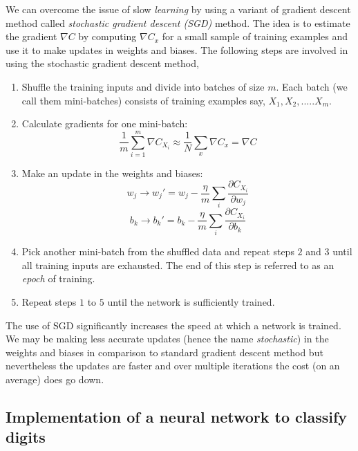 We can overcome the issue of slow \emph{learning} by using a variant of gradient descent method called \emph{stochastic gradient descent (SGD)} method. The idea is to estimate the gradient
$\nabla C$ by computing $\nabla C_x$ for a small sample of training examples and use it to make updates in weights and biases. The following steps are involved in using the stochastic gradient descent method,
\begin{enumerate}
    \item Shuffle the training inputs and divide into batches of size $m$. Each batch (we call them mini-batches) consists of training examples say, $X_1, X_2, .....X_m$.
    \item Calculate gradients for one mini-batch: $$\frac{1}{m} \sum_{i=1}^{m} \nabla C_{X_i} \approx \frac{1}{N} \sum_x \nabla C_x = \nabla C$$
    \item Make an update in the weights and biases: 
    $$w_j \rightarrow w_j' = w_j - \frac{\eta}{m} \sum_i \frac{\partial C_{X_i}}{\partial w_j}$$
    $$b_k \rightarrow b_k' = b_k - \frac{\eta}{m} \sum_i \frac{\partial C_{X_i}}{\partial b_k}$$
    \item Pick another mini-batch from the shuffled data and repeat steps $2$ and $3$ until all training inputs are exhausted. The end of this step is referred to as an \emph{epoch} of training.
    \item Repeat steps $1$ to $5$ until the network is sufficiently trained.
\end{enumerate}
The use of SGD significantly increases the speed at which a network is trained. We may be making less accurate updates (hence the name \emph{stochastic}) in the weights and biases in comparison to 
standard gradient descent method but nevertheless the updates are faster and over multiple iterations the cost (on an average) does go down. 
\subsection{Implementation of a neural network to classify digits}
